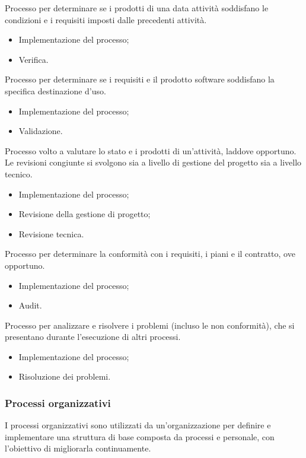 Processo per determinare se i prodotti di una data attività soddisfano
le condizioni e i requisiti imposti dalle precedenti attività.
\begin{itemize}
    \item Implementazione del processo;
    \item Verifica.
\end{itemize}

Processo per determinare se i requisiti e il prodotto software soddisfano la specifica destinazione d'uso.
\begin{itemize}
    \item Implementazione del processo;
    \item Validazione.
\end{itemize}

Processo volto a valutare lo stato e i prodotti di un'attività, laddove opportuno. 
Le revisioni congiunte si svolgono sia a livello di gestione del progetto sia a livello tecnico.
\begin{itemize}
    \item Implementazione del processo;
    \item Revisione della gestione di progetto;
    \item Revisione tecnica.
\end{itemize}

Processo per determinare la conformità con i requisiti, i piani e il contratto, ove opportuno.
\begin{itemize}
    \item Implementazione del processo;
    \item Audit.
\end{itemize}

Processo per analizzare e risolvere i problemi (incluso le non conformità),
che si presentano durante l'esecuzione di altri processi. 
\begin{itemize}
    \item Implementazione del processo;
    \item Risoluzione dei problemi.
\end{itemize}

\subsubsection{Processi organizzativi}
I processi organizzativi sono utilizzati da un'organizzazione per definire e implementare una struttura di base composta da processi e personale, con l'obiettivo di migliorarla continuamente.

